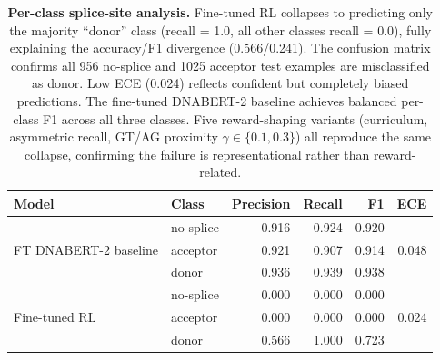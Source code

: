 \documentclass[sigconf,screen]{acmart}
\newcommand{\dnabert}{DNABERT-2\xspace}
\begin{document}
\begin{table}[!ht]
\centering
\small
\begin{tabular}{llrrrr}
\toprule
\textbf{Model} & \textbf{Class} & \textbf{Precision} & \textbf{Recall} & \textbf{F1} & \textbf{ECE} \\
\midrule
\multirow{3}{*}{FT \dnabert baseline} & no-splice & 0.916 & 0.924 & 0.920 & \multirow{3}{*}{0.048} \\
 & acceptor & 0.921 & 0.907 & 0.914 & \\
 & donor & 0.936 & 0.939 & 0.938 & \\
\midrule
\multirow{3}{*}{Fine-tuned RL} & no-splice & 0.000 & 0.000 & 0.000 & \multirow{3}{*}{0.024} \\
 & acceptor & 0.000 & 0.000 & 0.000 & \\
 & donor & 0.566 & 1.000 & 0.723 & \\
\bottomrule
\end{tabular}
\caption{\textbf{Per-class splice-site analysis.} Fine-tuned RL collapses to predicting only the majority ``donor'' class (recall = 1.0, all other classes recall = 0.0), fully explaining the accuracy/F1 divergence (0.566/0.241). The confusion matrix confirms all 956 no-splice and 1025 acceptor test examples are misclassified as donor. Low ECE (0.024) reflects confident but completely biased predictions. The fine-tuned \dnabert baseline achieves balanced per-class F1 across all three classes. Five reward-shaping variants (curriculum, asymmetric recall, GT/AG proximity $\gamma \in \{0.1, 0.3\}$) all reproduce the same collapse, confirming the failure is representational rather than reward-related.}
\label{tab:splice_perclass}
\end{table}
\end{document}
